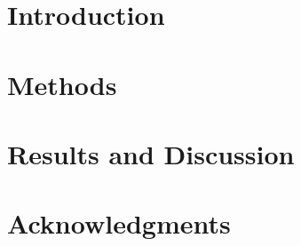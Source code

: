 \documentclass[fleqn,10pt]{SelfArx} %
\affiliation{\textsuperscript{1}\textit{Department of Computer Science}} %
\begin{document}
\flushbottom %

\maketitle %

\tableofcontents %

\thispagestyle{empty} %


\section*{Introduction} %




\section{Methods}


\section{Results and Discussion}



\section*{Acknowledgments} %



\nocite{*}



\end{document}
